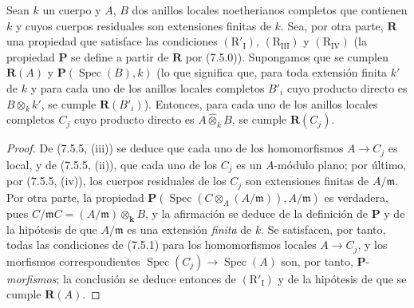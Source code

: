 \begin{proposition}[7.5.6]
\label{IV.2.s7.5.6-fr}
Sean $k$ un cuerpo y $A$, $B$ dos anillos locales noetherianos completos
que contienen $k$ y cuyos cuerpos residuales son extensiones finitas
de $k$. Sea, por otra parte, $\boldsymbol R$ una propiedad que satisface
las condiciones $(\mathrm R'_{\mathrm I})$,
$(\mathrm R_{\mathrm{III}})$ y $(\mathrm R_{\mathrm{IV}})$ \textup{(la propiedad
$\boldsymbol P$ se define a partir de $\boldsymbol R$ por (7.5.0))}.
Supongamos que se cumplen $\boldsymbol R(A)$ y
$\boldsymbol P(\operatorname{Spec}(B),k)$ \textup{(lo que significa que, para
toda extensión finita $k'$ de $k$ y para cada uno de los anillos locales
completos $B'_i$ cuyo producto directo es $B\otimes_k k'$, se cumple
$\boldsymbol R(B'_i)$)}. Entonces, para cada uno de los anillos locales
completos $C_j$ cuyo producto directo es $A\widehat\otimes_k B$,
se cumple $\boldsymbol R(C_j)$.
\end{proposition}

\begin{proof}
De (7.5.5, (iii)) se deduce que cada uno de los homomorfismos
$A\to C_j$ es local, y de (7.5.5, (ii)), que cada uno de los $C_j$ es
un $A$-módulo plano; por último, por (7.5.5, (iv)), los cuerpos
residuales de los $C_j$ son extensiones finitas de $A/\mathfrak m$.
Por otra parte, la propiedad
$\boldsymbol P(\operatorname{Spec}(C\otimes_A(A/\mathfrak m)),A/\mathfrak m)$
es verdadera, pues $C/\mathfrak mC=(A/\mathfrak m)\otimes_{\boldsymbol{k}}B$, y la
afirmación se deduce de la definición de $\boldsymbol P$ y de la
hipótesis de que $A/\mathfrak m$ es una extensión \emph{finita} de $k$.
Se satisfacen, por tanto, todas las condiciones de (7.5.1) para los
homomorfismos locales $A\to C_j$, y los morfismos correspondientes
$\operatorname{Spec}(C_j)\to\operatorname{Spec}(A)$ son, por tanto,
$\boldsymbol P$-\emph{morfismos}; la conclusión se deduce entonces de
$(\mathrm R'_{\mathrm I})$ y de la hipótesis de que se cumple
$\boldsymbol R(A)$.
\end{proof}
